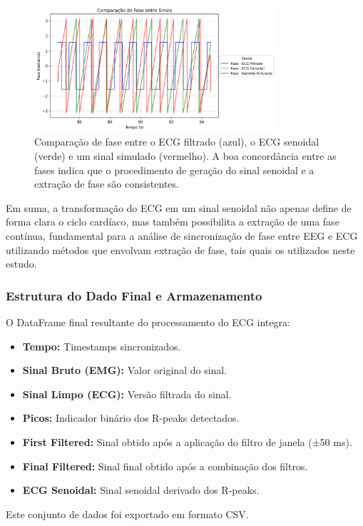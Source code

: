 \begin{figure}[htb]
    \centering
    \includegraphics[width=0.8\textwidth]{figs/2_preprocessamento_ecg/3_Comparação_de_Fase_entre_Sinais.png}
    \caption{Comparação de fase entre o ECG filtrado (azul), o ECG senoidal (verde) e um sinal simulado (vermelho). A boa concordância entre as fases indica que o procedimento de geração do sinal senoidal e a extração de fase são consistentes.}
    \label{fig:ecg_comparacao_fase}
\end{figure}

Em suma, a transformação do ECG em um sinal senoidal não apenas define de forma clara o ciclo cardíaco, mas também possibilita a extração de uma fase contínua, fundamental para a análise de sincronização de fase entre EEG e ECG utilizando métodos que envolvam extração de fase, tais quais os utilizados neste estudo.

\subsubsection{Estrutura do Dado Final e Armazenamento}

O DataFrame final resultante do processamento do ECG integra:
\begin{itemize}
    \item \textbf{Tempo:} Timestamps sincronizados.
    \item \textbf{Sinal Bruto (EMG):} Valor original do sinal.
    \item \textbf{Sinal Limpo (ECG):} Versão filtrada do sinal.
    \item \textbf{Picos:} Indicador binário dos R-peaks detectados.
    \item \textbf{First Filtered:} Sinal obtido após a aplicação do filtro de janela (±50 ms).
    \item \textbf{Final Filtered:} Sinal final obtido após a combinação dos filtros.
    \item \textbf{ECG Senoidal:} Sinal senoidal derivado dos R-peaks.
\end{itemize}
Este conjunto de dados foi exportado em formato CSV.